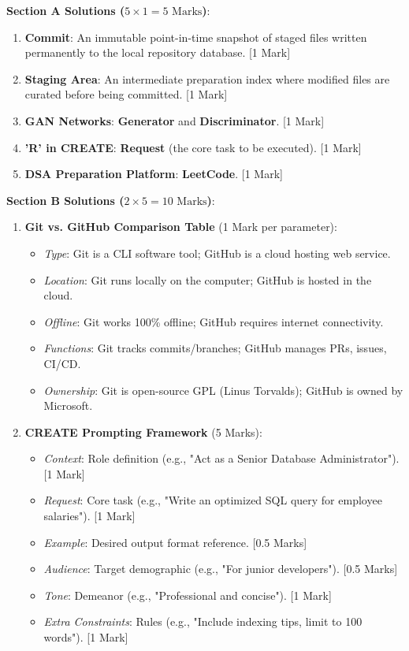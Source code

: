 \begin{solutionbox}
\noindent\textbf{Section A Solutions ($5 \times 1 = 5\text{ Marks}$)}:
\begin{enumerate}
    \item \textbf{Commit}: An immutable point-in-time snapshot of staged files written permanently to the local repository database. [1 Mark]
    \item \textbf{Staging Area}: An intermediate preparation index where modified files are curated before being committed. [1 Mark]
    \item \textbf{GAN Networks}: \textbf{Generator} and \textbf{Discriminator}. [1 Mark]
    \item \textbf{'R' in CREATE}: \textbf{Request} (the core task to be executed). [1 Mark]
    \item \textbf{DSA Preparation Platform}: \textbf{LeetCode}. [1 Mark]
\end{enumerate}

\medskip
\noindent\textbf{Section B Solutions ($2 \times 5 = 10\text{ Marks}$)}:
\begin{enumerate}[start=6]
    \item \textbf{Git vs. GitHub Comparison Table} (1 Mark per parameter):
    \begin{itemize}
        \item \textit{Type}: Git is a CLI software tool; GitHub is a cloud hosting web service.
        \item \textit{Location}: Git runs locally on the computer; GitHub is hosted in the cloud.
        \item \textit{Offline}: Git works 100\% offline; GitHub requires internet connectivity.
        \item \textit{Functions}: Git tracks commits/branches; GitHub manages PRs, issues, CI/CD.
        \item \textit{Ownership}: Git is open-source GPL (Linus Torvalds); GitHub is owned by Microsoft.
    \end{itemize}

    \item \textbf{CREATE Prompting Framework} (5 Marks):
    \begin{itemize}
        \item \textit{Context}: Role definition (e.g., "Act as a Senior Database Administrator"). [1 Mark]
        \item \textit{Request}: Core task (e.g., "Write an optimized SQL query for employee salaries"). [1 Mark]
        \item \textit{Example}: Desired output format reference. [0.5 Marks]
        \item \textit{Audience}: Target demographic (e.g., "For junior developers"). [0.5 Marks]
        \item \textit{Tone}: Demeanor (e.g., "Professional and concise"). [1 Mark]
        \item \textit{Extra Constraints}: Rules (e.g., "Include indexing tips, limit to 100 words"). [1 Mark]
    \end{itemize}
\end{enumerate}


\end{solutionbox}
